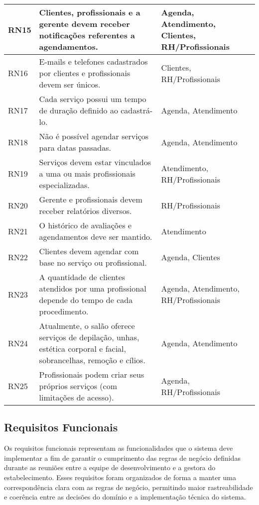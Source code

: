 \begin{longtable}{|p{1.2cm}|p{10cm}|p{4cm}|}
	\hline
	RN15 & Clientes, profissionais e a gerente devem receber notificações referentes a agendamentos. & Agenda, Atendimento, Clientes, RH/Profissionais \\
	\hline
	RN16 & E-mails e telefones cadastrados por clientes e profissionais devem ser únicos. & Clientes, RH/Profissionais \\
	\hline
	RN17 & Cada serviço possui um tempo de duração definido ao cadastrá-lo. & Agenda, Atendimento \\
	\hline
	RN18 & Não é possível agendar serviços para datas passadas. & Agenda, Atendimento \\
	\hline
	RN19 & Serviços devem estar vinculados a uma ou mais profissionais especializadas. & Atendimento, RH/Profissionais \\
	\hline
	RN20 & Gerente e profissionais devem receber relatórios diversos. & RH/Profissionais \\
	\hline
	RN21 & O histórico de avaliações e agendamentos deve ser mantido. & Atendimento \\
	\hline
	RN22 & Clientes devem agendar com base no serviço ou profissional. & Agenda, Clientes \\
	\hline
	RN23 & A quantidade de clientes atendidos por uma profissional depende do tempo de cada procedimento. & Agenda, Atendimento, RH/Profissionais \\
	\hline
	RN24 & Atualmente, o salão oferece serviços de depilação, unhas, estética corporal e facial, sobrancelhas, remoção e cílios. & Agenda, Atendimento \\
	\hline
	RN25 & Profissionais podem criar seus próprios serviços (com limitações de acesso). & Agenda, RH/Profissionais \\
	\hline
	
\end{longtable}

\subsection{Requisitos Funcionais}

Os requisitos funcionais representam as funcionalidades que o sistema deve implementar a fim de garantir o cumprimento das regras de negócio definidas durante as reuniões entre a equipe de desenvolvimento e a gestora do estabelecimento. Esses requisitos foram organizados de forma a manter uma correspondência clara com as regras de negócio, permitindo maior rastreabilidade e coerência entre as decisões do domínio e a implementação técnica do sistema.


